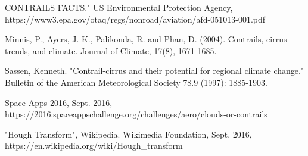 


\begin{thebibliography}{9}

CONTRAILS FACTS." US Environmental Protection Agency, https://www3.epa.gov/otaq/regs/nonroad/aviation/afd-051013-001.pdf

Minnis, P., Ayers, J. K., Palikonda, R. and Phan, D. (2004). Contrails,
cirrus trends, and climate. Journal of Climate, 17(8), 1671-1685.

Sassen, Kenneth. "Contrail-cirrus and their potential for regional climate change." Bulletin of the American Meteorological Society 78.9 (1997): 1885-1903.

Space Apps 2016, Sept. 2016,
https://2016.spaceappschallenge.org/challenges/aero/clouds-or-contrails

"Hough Transform", Wikipedia. Wikimedia Foundation, Sept. 2016,
 https://en.wikipedia.org/wiki/Hough\_transform




\end{thebibliography}
